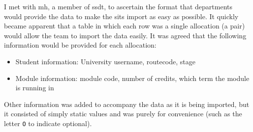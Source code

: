 I met with \gls{mh}, a member of \gls{ssdt}, to ascertain the format that
departments would provide the data to make the \gls{sits} import as easy as
possible. It quickly became apparent that a table in which each row was a
single allocation (a \studmod pair) would allow the team to import the data
easily. It was agreed that the following information would be provided for
each allocation:

\begin{itemize}
  \item Student information: University username, \gls{routecode}, \gls{stage}
  \item Module information: module code, number of credits, which term the module is running in
\end{itemize}

Other information was added to accompany the data as it is being imported, but it
consisted of simply static values and was purely for convenience (such as the
letter \texttt{O} to indicate optional).

